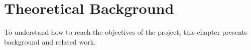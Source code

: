 %

\section{Theoretical Background}

To understand how to reach the objectives of the project, this chapter presents background and related work.







